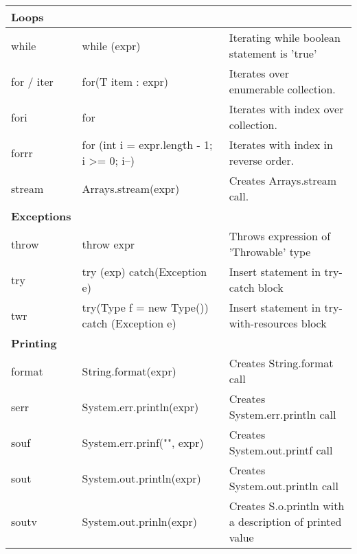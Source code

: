 \documentclass{article}
\begin{document}
\begin{center}
\begin{tabularx}{\textwidth}[t]{m{3cm}ll}
\arrayrulecolor{green}\hline
\textbf{\textcolor{myGreen}{Loops}} & \\
\hline
while & while (expr) {} & Iterating while boolean statement is 'true' \\
for / iter & for(T item : expr) & Iterates over enumerable collection. \\
fori & for & Iterates with index over collection. \\
forrr & for (int i = expr.length - 1; i >= 0; i--) & Iterates with index in reverse order. \\
stream & Arrays.stream(expr) & Creates Arrays.stream call.\\

\arrayrulecolor{green}\hline
\textbf{\textcolor{myGreen}{Exceptions}} & \\
\hline
throw & throw expr & Throws expression of 'Throwable' type\\
try & try (exp) catch(Exception e) & Insert statement in try-catch block \\
twr & try(Type f = new Type()) catch (Exception e)  & Insert statement in try-with-resources block \\

\arrayrulecolor{green}\hline
\textbf{\textcolor{myGreen}{Printing}} & \\
\hline
format & String.format(expr) & Creates String.format call \\
serr & System.err.println(expr) & Creates System.err.println call \\
souf & System.err.prinf("", expr) & Creates System.out.printf call \\
sout & System.out.println(expr) & Creates System.out.println call \\
soutv & System.out.prinln(expr) & Creates S.o.println with a description of printed value \\

\end{tabularx}
\end{center}
\end{document}
